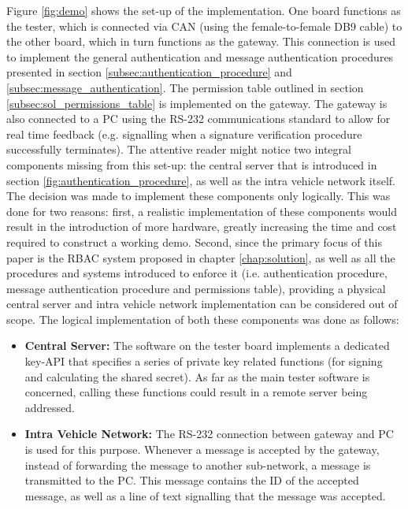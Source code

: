 Figure \ref{fig:demo} shows the set-up of the implementation. One board functions as the tester, which is connected via CAN (using the female-to-female DB9 cable) to the other board, which in turn functions as the gateway. This connection is used to implement the general authentication and message authentication procedures presented in section \ref{subsec:authentication_procedure} and \ref{subsec:message_authentication}. The permission table outlined in section \ref{subsec:sol_permissions_table} is implemented on the gateway. The gateway is also connected to a PC using the RS-232 communications standard to allow for real time feedback (e.g. signalling when a signature verification procedure successfully terminates). The attentive reader might notice two integral components missing from this set-up: the central server that is introduced in section \ref{fig:authentication_procedure}, as well as the intra vehicle network itself. The decision was made to implement these components only logically. This was done for two reasons: first, a realistic implementation of these components would result in the introduction of more hardware, greatly increasing the time and cost required to construct a working demo. Second, since the primary focus of this paper is the RBAC system proposed in chapter \ref{chap:solution}, as well as all the procedures and systems introduced to enforce it (i.e. authentication procedure, message authentication procedure and permissions table), providing a physical central server and intra vehicle network implementation can be considered out of scope. The logical implementation of both these components was done as follows:
\begin{itemize}
	\item \textbf{Central Server:} The software on the tester board implements a dedicated key-API that specifies a series of private key related functions (for signing and calculating the shared secret). As far as the main tester software is concerned, calling these functions could result in a remote server being addressed.
	
	\item \textbf{Intra Vehicle Network:} The RS-232 connection between gateway and PC is used for this purpose. Whenever a message is accepted by the gateway, instead of forwarding the message to another sub-network, a message is transmitted to the PC. This message contains the ID of the accepted message, as well as a line of text signalling that the message was accepted.
\end{itemize}

